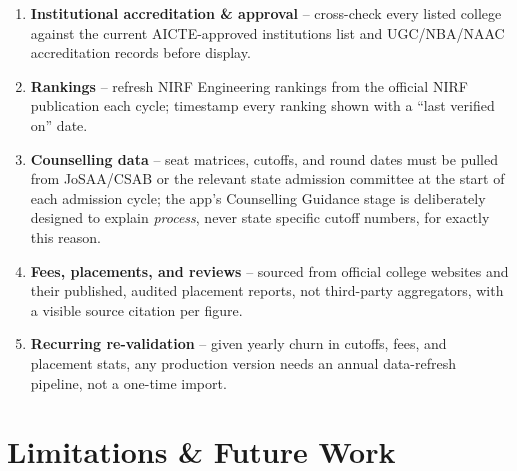 \documentclass[11pt]{article}
\begin{document}
\begin{enumerate}
\item \textbf{Institutional accreditation \& approval} -- cross-check every listed college against the current AICTE-approved institutions list and UGC/NBA/NAAC accreditation records before display.
\item \textbf{Rankings} -- refresh NIRF Engineering rankings from the official NIRF publication each cycle; timestamp every ranking shown with a ``last verified on'' date.
\item \textbf{Counselling data} -- seat matrices, cutoffs, and round dates must be pulled from JoSAA/CSAB or the relevant state admission committee at the start of each admission cycle; the app's Counselling Guidance stage is deliberately designed to explain \emph{process}, never state specific cutoff numbers, for exactly this reason.
\item \textbf{Fees, placements, and reviews} -- sourced from official college websites and their published, audited placement reports, not third-party aggregators, with a visible source citation per figure.
\item \textbf{Recurring re-validation} -- given yearly churn in cutoffs, fees, and placement stats, any production version needs an annual data-refresh pipeline, not a one-time import.
\end{enumerate}

\section{Limitations \& Future Work}
\label{sec:limitations}
\end{document}
